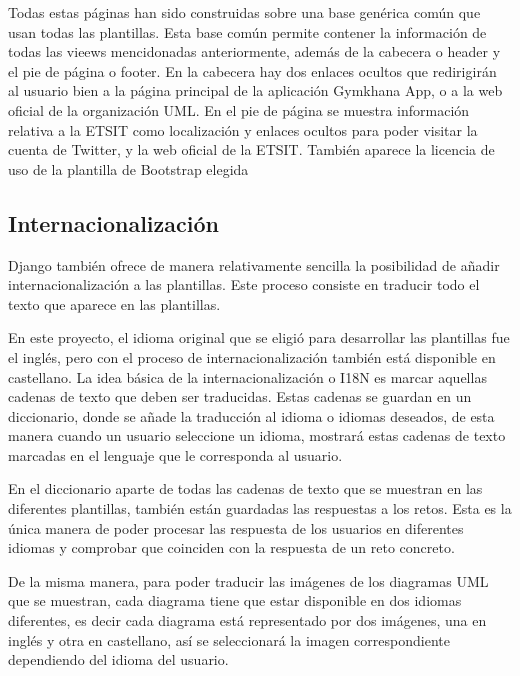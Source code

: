 \documentclass[a4paper, 12pt]{book}
\begin{document}
Todas estas páginas han sido construidas sobre una base genérica común que usan todas las plantillas. Esta base común permite contener la información de todas las vieews mencidonadas anteriormente, además de la cabecera o header y el pie de página o footer. En la cabecera hay dos enlaces ocultos que redirigirán al usuario bien a la página principal de la aplicación Gymkhana App, o a la web oficial de la organización UML. En el pie de página se muestra información relativa a la ETSIT como localización y enlaces ocultos para poder visitar la cuenta de Twitter, y la web oficial de la ETSIT. También aparece la licencia de uso de la plantilla de Bootstrap elegida

\subsection{Internacionalización}
Django también ofrece de manera relativamente sencilla la posibilidad de añadir internacionalización a las plantillas. Este proceso consiste en traducir todo el texto que aparece en las plantillas. 

En este proyecto, el idioma original que se eligió para desarrollar las plantillas fue el inglés, pero con el proceso de internacionalización también está disponible en castellano. La idea básica de la internacionalización o I18N es marcar aquellas cadenas de texto que deben ser traducidas. Estas cadenas se guardan en un diccionario, donde se añade la traducción al idioma o idiomas deseados, de esta manera cuando un usuario seleccione un idioma, mostrará estas cadenas de texto marcadas en el lenguaje que le corresponda al usuario. 

En el diccionario aparte de todas las cadenas de texto que se muestran en las diferentes plantillas, también están guardadas las respuestas a los retos. Esta es la única manera de poder procesar las respuesta de los usuarios en diferentes idiomas y comprobar que coinciden con la respuesta de un reto concreto. 

De la misma manera, para poder traducir las imágenes de los diagramas UML que se muestran, cada diagrama tiene que estar disponible en dos idiomas diferentes, es decir cada diagrama está representado por dos imágenes, una en inglés y otra en castellano, así se seleccionará la imagen correspondiente dependiendo del idioma del usuario. 
\end{document}
